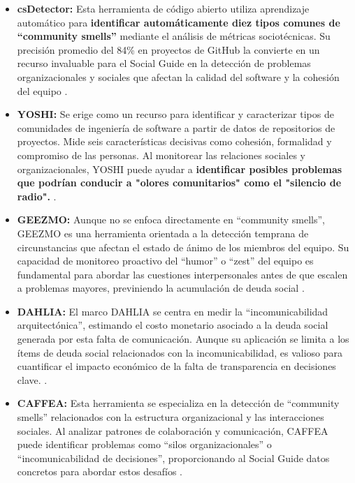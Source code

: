 \begin{itemize}
    \item \textbf{csDetector:} Esta herramienta de código abierto utiliza aprendizaje automático para \textbf{identificar automáticamente diez tipos comunes de ``community smells''} mediante el análisis de métricas sociotécnicas. Su precisión promedio del 84\% en proyectos de GitHub la convierte en un recurso invaluable para el Social Guide en la detección de problemas organizacionales y sociales que afectan la calidad del software y la cohesión del equipo \cite{almarimi2021csDetector}.
    \item \textbf{YOSHI:} Se erige como un recurso para identificar y caracterizar tipos de comunidades de ingeniería de software a partir de datos de repositorios de proyectos. Mide seis características decisivas como cohesión, formalidad y compromiso de las personas. Al monitorear las relaciones sociales y organizacionales, YOSHI puede ayudar a \textbf{identificar posibles problemas que podrían conducir a "olores comunitarios" como el "silencio de radio".} \cite{maelstromdat2014yoshi}.
    \item \textbf{GEEZMO:} Aunque no se enfoca directamente en ``community smells'', GEEZMO es una herramienta orientada a la detección temprana de circunstancias que afectan el estado de ánimo de los miembros del equipo. Su capacidad de monitoreo proactivo del ``humor'' o ``zest'' del equipo es fundamental para abordar las cuestiones interpersonales antes de que escalen a problemas mayores, previniendo la acumulación de deuda social \cite{saeeda2024multivocal}.
    \item \textbf{DAHLIA:} El marco DAHLIA se centra en medir la ``incomunicabilidad arquitectónica'', estimando el costo monetario asociado a la deuda social generada por esta falta de comunicación. Aunque su aplicación se limita a los ítems de deuda social relacionados con la incomunicabilidad, es valioso para cuantificar el impacto económico de la falta de transparencia en decisiones clave. \cite{falessi2021worstsmells}.
    \item \textbf{CAFFEA:} Esta herramienta se especializa en la detección de ``community smells'' relacionados con la estructura organizacional y las interacciones sociales. Al analizar patrones de colaboración y comunicación, CAFFEA puede identificar problemas como ``silos organizacionales'' o ``incomunicabilidad de decisiones'', proporcionando al Social Guide datos concretos para abordar estos desafíos \cite{martini2017caffea}.
\end{itemize}

